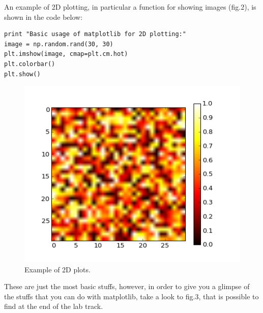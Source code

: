 \documentclass[aps,letterpaper,10pt]{revtex4}
\begin{document}
An example of 2D plotting, in particular a function for showing images (fig.2), is shown in the code below:
\begin{lstlisting}
print "Basic usage of matplotlib for 2D plotting:"
image = np.random.rand(30, 30)
plt.imshow(image, cmap=plt.cm.hot)  
plt.colorbar()
plt.show()
\end{lstlisting}
\begin{figure}[h]
\includegraphics[scale=0.3]{img/numpy_plot2D.png}
\caption{Example of 2D plots.}\label{fig:2}
\end{figure}
These are just the most basic stuffs, however, in order to give you a glimpse of the stuffs that you can do with matplotlib, take a look to fig.3, that is possible to find at the end of the lab track.
\end{document}
